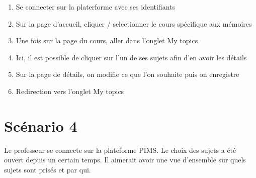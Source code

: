 \documentclass[a4paper, 11pt]{article}
\begin{document}
\begin{tcolorbox}
    \begin{enumerate}
        \item Se connecter sur la platerforme avec ses identifiants
        \item Sur la page d'accueil, cliquer / selectionner le cours spécifique aux mémoires
        \item Une fois sur la page du cours, aller dans l'onglet \og My topics\fg{}
        \item Ici, il est possible de cliquer sur l'un de ses sujets afin d'en avoir les détails
        \item Sur la page de détails, on modifie ce que l'on souhaite puis on enregistre
        \item Redirection vers l'onglet \og My topics\fg{}
    \end{enumerate}
\end{tcolorbox}



\section*{Scénario 4}
Le professeur se connecte sur la plateforme PIMS. Le choix des sujets a été ouvert depuis un certain temps. Il aimerait avoir une vue d'ensemble sur quels sujets sont prisés et par qui.
\end{document}
